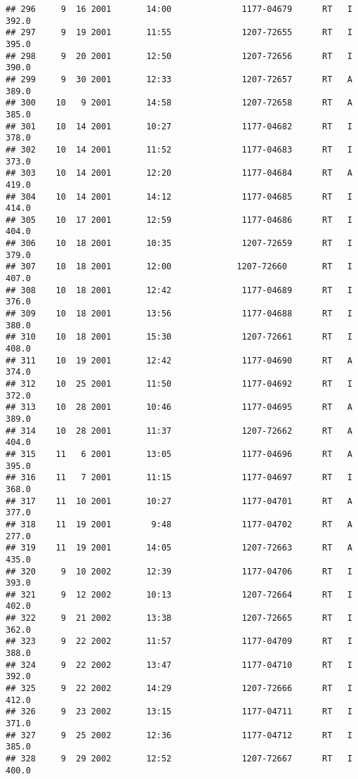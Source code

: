 \documentclass[
]{article}
\begin{document}
\begin{verbatim}
## 296     9  16 2001       14:00              1177-04679      RT   I     392.0
## 297     9  19 2001       11:55              1207-72655      RT   I     395.0
## 298     9  20 2001       12:50              1207-72656      RT   I     390.0
## 299     9  30 2001       12:33              1207-72657      RT   A     389.0
## 300    10   9 2001       14:58              1207-72658      RT   A     385.0
## 301    10  14 2001       10:27              1177-04682      RT   I     378.0
## 302    10  14 2001       11:52              1177-04683      RT   I     373.0
## 303    10  14 2001       12:20              1177-04684      RT   A     419.0
## 304    10  14 2001       14:12              1177-04685      RT   I     414.0
## 305    10  17 2001       12:59              1177-04686      RT   I     404.0
## 306    10  18 2001       10:35              1207-72659      RT   I     379.0
## 307    10  18 2001       12:00             1207-72660       RT   I     407.0
## 308    10  18 2001       12:42              1177-04689      RT   I     376.0
## 309    10  18 2001       13:56              1177-04688      RT   I     380.0
## 310    10  18 2001       15:30              1207-72661      RT   I     408.0
## 311    10  19 2001       12:42              1177-04690      RT   A     374.0
## 312    10  25 2001       11:50              1177-04692      RT   I     372.0
## 313    10  28 2001       10:46              1177-04695      RT   A     389.0
## 314    10  28 2001       11:37              1207-72662      RT   A     404.0
## 315    11   6 2001       13:05              1177-04696      RT   A     395.0
## 316    11   7 2001       11:15              1177-04697      RT   I     368.0
## 317    11  10 2001       10:27              1177-04701      RT   A     377.0
## 318    11  19 2001        9:48              1177-04702      RT   A     277.0
## 319    11  19 2001       14:05              1207-72663      RT   A     435.0
## 320     9  10 2002       12:39              1177-04706      RT   I     393.0
## 321     9  12 2002       10:13              1207-72664      RT   I     402.0
## 322     9  21 2002       13:38              1207-72665      RT   I     362.0
## 323     9  22 2002       11:57              1177-04709      RT   I     388.0
## 324     9  22 2002       13:47              1177-04710      RT   I     392.0
## 325     9  22 2002       14:29              1207-72666      RT   I     412.0
## 326     9  23 2002       13:15              1177-04711      RT   I     371.0
## 327     9  25 2002       12:36              1177-04712      RT   I     385.0
## 328     9  29 2002       12:52              1207-72667      RT   I     400.0

\end{verbatim}
\end{document}
